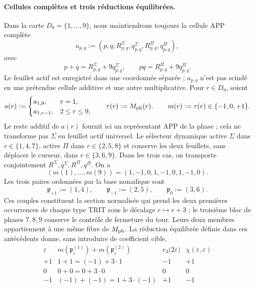 \paragraph{Cellules complètes et trois réductions équilibrées.}
Dans la carte \(D_9=\{1,\ldots,9\}\), nous maintiendrons toujours la cellule APP complète
\[
 a_{p,q}:=(p,q;R^\Sigma_{p,q},q^\Sigma_{p,q},
                 R^\Pi_{p,q},q^\Pi_{p,q}),
\]
avec
\[
 p+q=R^\Sigma_{p,q}+9q^\Sigma_{p,q},\qquad
 pq=R^\Pi_{p,q}+9q^\Pi_{p,q}.
\]
Le feuillet actif est enregistré dans une coordonnée séparée ; \(a_{p,q}\) n'est pas scindé en une prétendue cellule additive et une autre multiplicative. Pour \(r\in D_9\), soient
\begin{equation}
 a(r):=
 \begin{cases}
  a_{1,9},&r=1,\\
  a_{1,r-1},&2\le r\le9,
 \end{cases}
 \qquad
 \tau(r):=M_{\rm ph}(r),
 \qquad
 m(r):=\tau(r)\in\{-1,0,+1\}.
 \label{hmtfg:eq:celula-completa-fase-ch}
\end{equation}
Le reste additif de \(a(r)\) fournit ici un représentant APP de la
phase ; cela ne transforme pas \(\Sigma\) en feuillet actif universel. Le sélecteur
dynamique active \(\Sigma\) dans \(r\in\{1,4,7\}\), active \(\Pi\) dans
\(r\in\{2,5,8\}\) et conserve les deux feuillets, sans déplacer le curseur, dans
\(r\in\{3,6,9\}\). Dans les trois cas, on transporte conjointement
\(R^\Sigma,q^\Sigma,R^\Pi,q^\Pi\). On a
\[
 (m(1),\ldots,m(9))=(1,-1,0,1,-1,0,1,-1,0).
\]
Les trois paires ordonnées par la base nonadique sont
\begin{equation}
 \mathfrak p_{+1}:=(1,4),\qquad
 \mathfrak p_{-1}:=(2,5),\qquad
 \mathfrak p_{0}:=(3,6).
 \label{hmtfg:eq:tres-pares-internos-ch}
\end{equation}
Ces couples constituent la section normalisée qui prend les deux premières occurrences de chaque type TRIT sous le décalage \(r\mapsto r+3\) ; le troisième bloc de phases \(7,8,9\) conserve le contrôle de fermeture du tour. Leurs deux membres appartiennent à une même fibre de \(M_{\rm ph}\). La réduction équilibrée définie dans ces antécédents donne, sans introduire de coefficient cible,
\begin{equation}
 \begin{array}{c|c|c|c}
 \varepsilon&m(\mathfrak p_\varepsilon^{(1)})
                  +m(\mathfrak p_\varepsilon^{(2)})
   &r_3\bigl(2\varepsilon\bigr)&
   \chi(\varepsilon,\varepsilon)\\ \hline
 +1&1+1=(-1)+3\cdot1&-1&+1\\
 0&0+0=0+3\cdot0&0&0\\
 -1&(-1)+(-1)=1+3\cdot(-1)&+1&-1
 \end{array}
 \label{hmtfg:eq:tres-carry-derivados-ch}
\end{equation}
